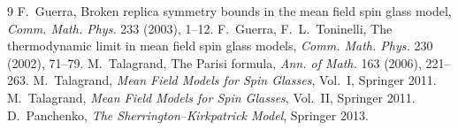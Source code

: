 \documentclass[11pt]{article}
\begin{document}
\begin{thebibliography}{9}
 F.~Guerra, Broken replica symmetry bounds in the mean field spin glass
model, \emph{Comm. Math. Phys.} 233 (2003), 1--12.
 F.~Guerra, F.~L.~Toninelli, The thermodynamic limit in mean field spin glass
models, \emph{Comm. Math. Phys.} 230 (2002), 71--79.
 M.~Talagrand, The Parisi formula, \emph{Ann. of Math.} 163 (2006), 221--263.
 M.~Talagrand, \emph{Mean Field Models for Spin Glasses}, Vol.~I, Springer 2011.
 M.~Talagrand, \emph{Mean Field Models for Spin Glasses}, Vol.~II, Springer 2011.
 D.~Panchenko, \emph{The Sherrington--Kirkpatrick Model}, Springer 2013.
\end{thebibliography}
\end{document}
